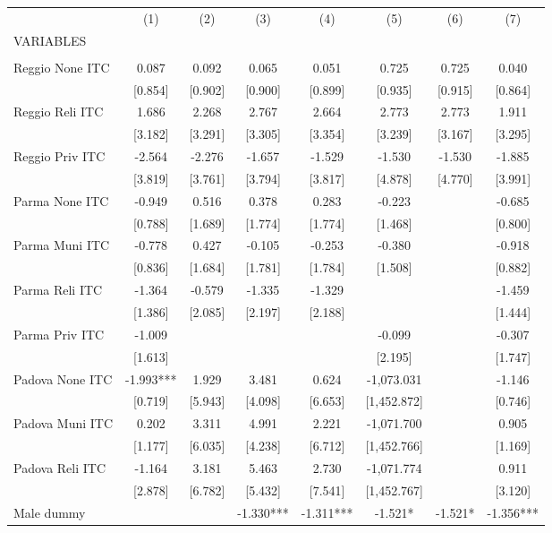 \begin{tabular}{lccccccc} \hline
 & (1) & (2) & (3) & (4) & (5) & (6) & (7) \\
VARIABLES &  &  &  &  &  &  &  \\ \hline
 &  &  &  &  &  &  &  \\
Reggio None ITC & 0.087 & 0.092 & 0.065 & 0.051 & 0.725 & 0.725 & 0.040 \\
 & [0.854] & [0.902] & [0.900] & [0.899] & [0.935] & [0.915] & [0.864] \\
Reggio Reli ITC & 1.686 & 2.268 & 2.767 & 2.664 & 2.773 & 2.773 & 1.911 \\
 & [3.182] & [3.291] & [3.305] & [3.354] & [3.239] & [3.167] & [3.295] \\
Reggio Priv ITC & -2.564 & -2.276 & -1.657 & -1.529 & -1.530 & -1.530 & -1.885 \\
 & [3.819] & [3.761] & [3.794] & [3.817] & [4.878] & [4.770] & [3.991] \\
Parma None ITC & -0.949 & 0.516 & 0.378 & 0.283 & -0.223 &  & -0.685 \\
 & [0.788] & [1.689] & [1.774] & [1.774] & [1.468] &  & [0.800] \\
Parma Muni ITC & -0.778 & 0.427 & -0.105 & -0.253 & -0.380 &  & -0.918 \\
 & [0.836] & [1.684] & [1.781] & [1.784] & [1.508] &  & [0.882] \\
Parma Reli ITC & -1.364 & -0.579 & -1.335 & -1.329 &  &  & -1.459 \\
 & [1.386] & [2.085] & [2.197] & [2.188] &  &  & [1.444] \\
Parma Priv ITC & -1.009 &  &  &  & -0.099 &  & -0.307 \\
 & [1.613] &  &  &  & [2.195] &  & [1.747] \\
Padova None ITC & -1.993*** & 1.929 & 3.481 & 0.624 & -1,073.031 &  & -1.146 \\
 & [0.719] & [5.943] & [4.098] & [6.653] & [1,452.872] &  & [0.746] \\
Padova Muni ITC & 0.202 & 3.311 & 4.991 & 2.221 & -1,071.700 &  & 0.905 \\
 & [1.177] & [6.035] & [4.238] & [6.712] & [1,452.766] &  & [1.169] \\
Padova Reli ITC & -1.164 & 3.181 & 5.463 & 2.730 & -1,071.774 &  & 0.911 \\
 & [2.878] & [6.782] & [5.432] & [7.541] & [1,452.767] &  & [3.120] \\
Male dummy &  &  & -1.330*** & -1.311*** & -1.521* & -1.521* & -1.356*** \\

\end{tabular}
